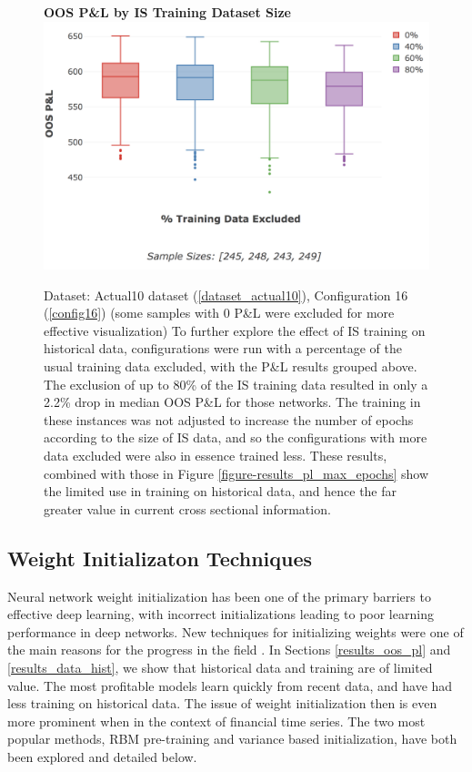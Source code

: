 \documentclass[a4paper,11pt,oneside]{article}
\theoremstyle{plain}
\theoremstyle{definition}
\begin{document}
	
	\begin{figure}[H]
		\centering 
		\textbf{OOS P\&L by IS Training Dataset Size}
		\includegraphics[scale=0.4]{images/results/8_3_historical/training_data_excluded.png}
		\caption[OOS P\&L by IS Training Dataset Size]{
			Dataset: Actual10 dataset (\ref{dataset_actual10}), Configuration 16 (\ref{config16}) (some samples with 0 P\&L were excluded for more effective visualization)
			\newline To further explore the effect of IS training on historical data, configurations were run with a percentage of the usual training data excluded, with the P\&L results grouped above. The exclusion of up to 80\% of the IS training data resulted in only a 2.2\% drop in median OOS P\&L for those networks. The training in these instances was not adjusted to increase the number of epochs according to the size of IS data, and so the configurations with more data excluded were also in essence trained less. These results, combined with those in Figure \ref{figure-results_pl_max_epochs} show the limited use in training on historical data, and hence the far greater value in current cross sectional information.}
		\label{figure-results_it3_validationset}
	\end{figure}
	
	
	\newpage
	
	\subsection{Weight Initializaton Techniques}\label{results_init}
	
	Neural network weight initialization has been one of the primary barriers to effective deep learning, with incorrect initializations leading to poor learning performance in deep networks. New techniques for initializing weights were one of the main reasons for the progress in the field \citep{Hinton2}. In Sections \ref{results_oos_pl} and \ref{results_data_hist}, we show that historical data and training are of limited value. The most profitable models learn quickly from recent data, and have had less training on historical data. The issue of weight initialization then is even more prominent when in the context of financial time series. The two most popular methods, RBM pre-training and variance based initialization, have both been explored and detailed below.
	
\end{document}
